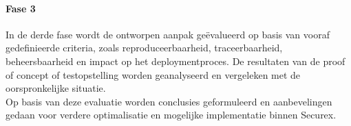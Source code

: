 
\paragraph{Fase 3}
In de derde fase wordt de ontworpen aanpak geëvalueerd op basis van vooraf gedefinieerde criteria, zoals reproduceerbaarheid, traceerbaarheid, beheersbaarheid en impact op het deploymentproces. De resultaten van de proof of concept of testopstelling worden geanalyseerd en vergeleken met de oorspronkelijke situatie.\\

Op basis van deze evaluatie worden conclusies geformuleerd en aanbevelingen gedaan voor verdere optimalisatie en mogelijke implementatie binnen Securex.



